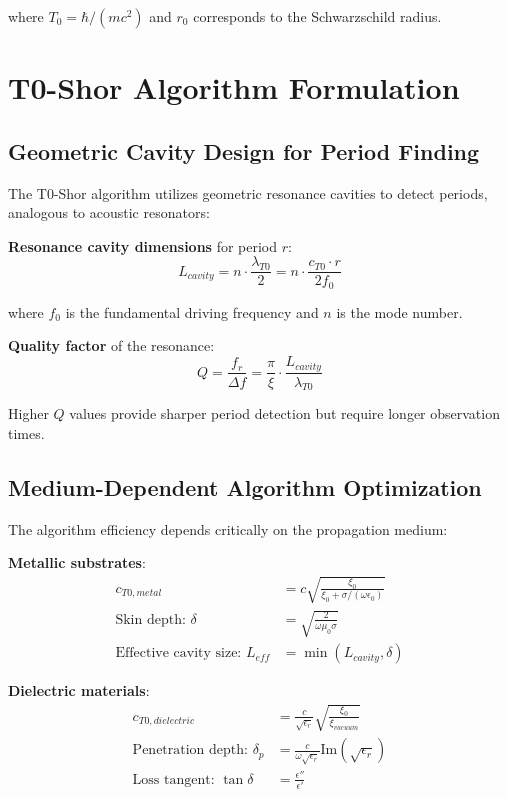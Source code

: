 \documentclass[12pt,a4paper]{article}
\begin{document}
	where $T_0 = \hbar/(mc^2)$ and $r_0$ corresponds to the Schwarzschild radius.
	
	\section{T0-Shor Algorithm Formulation}
	
	\subsection{Geometric Cavity Design for Period Finding}
	
	The T0-Shor algorithm utilizes geometric resonance cavities to detect periods, analogous to acoustic resonators:
	
	\textbf{Resonance cavity dimensions} for period $r$:
	\begin{equation}
		L_{cavity} = n \cdot \frac{\lambda_{T0}}{2} = n \cdot \frac{c_{T0} \cdot r}{2f_0}
	\end{equation}
	
	where $f_0$ is the fundamental driving frequency and $n$ is the mode number.
	
	\textbf{Quality factor} of the resonance:
	\begin{equation}
		Q = \frac{f_r}{\Delta f} = \frac{\pi}{\xi} \cdot \frac{L_{cavity}}{\lambda_{T0}}
	\end{equation}
	
	Higher $Q$ values provide sharper period detection but require longer observation times.
	
	\subsection{Medium-Dependent Algorithm Optimization}
	
	The algorithm efficiency depends critically on the propagation medium:
	
	\textbf{Metallic substrates}:
	\begin{align}
		c_{T0,metal} &= c \sqrt{\frac{\xi_0}{\xi_0 + \sigma/(\omega \epsilon_0)}} \\
		\text{Skin depth: } \delta &= \sqrt{\frac{2}{\omega \mu_0 \sigma}} \\
		\text{Effective cavity size: } L_{eff} &= \min(L_{cavity}, \delta)
	\end{align}
	
	\textbf{Dielectric materials}:
	\begin{align}
		c_{T0,dielectric} &= \frac{c}{\sqrt{\epsilon_r}} \sqrt{\frac{\xi_0}{\xi_{vacuum}}} \\
		\text{Penetration depth: } \delta_p &= \frac{c}{\omega \sqrt{\epsilon_r}} \text{Im}(\sqrt{\epsilon_r}) \\
		\text{Loss tangent: } \tan \delta &= \frac{\epsilon''}{\epsilon'}
	\end{align}
	
\end{document}
